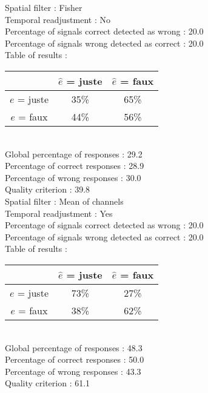 Spatial filter : Fisher \\
Temporal readjustment : No \\
Percentage of signals correct detected as wrong :   20.0 \\
Percentage of signals wrong detected as correct :   20.0 \\
Table of results : \\
\begin{tabular}{|c|c|c|}
\hline				& $\hat{e}$ = juste & $\hat{e}$ = faux \\
\hline  $e$ = juste	&     35\%			&     65\%		\\
\hline  $e$ = faux	&     44\%			&     56\%		\\
\hline
\end{tabular}\\
Global percentage of responses :   29.2 \\
Percentage of correct responses :   28.9 \\
Percentage of wrong responses :   30.0 \\
Quality criterion :   39.8 \\

Spatial filter : Mean of channels \\
Temporal readjustment : Yes \\
Percentage of signals correct detected as wrong :   20.0 \\
Percentage of signals wrong detected as correct :   20.0 \\
Table of results : \\
\begin{tabular}{|c|c|c|}
\hline				& $\hat{e}$ = juste & $\hat{e}$ = faux \\
\hline  $e$ = juste	&     73\%			&     27\%		\\
\hline  $e$ = faux	&     38\%			&     62\%		\\
\hline
\end{tabular}\\
Global percentage of responses :   48.3 \\
Percentage of correct responses :   50.0 \\
Percentage of wrong responses :   43.3 \\
Quality criterion :   61.1 \\

